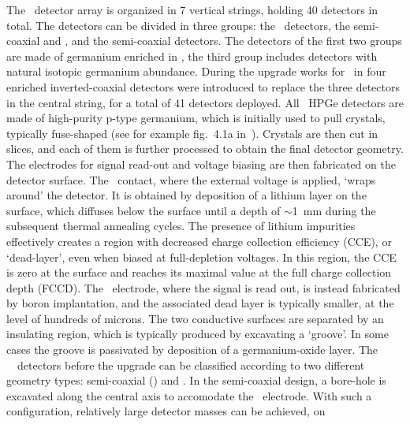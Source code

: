 The \gerdatwo\ detector array is organized in 7 vertical strings, holding 40 detectors in
total. The detectors can be divided in three groups: the \bege\ detectors, the
semi-coaxial  and , and the semi-coaxial  detectors. The detectors of
the first two groups are made of germanium enriched in \gesix, the third group includes
detectors with natural isotopic germanium abundance. During the upgrade works for
\phasetwop\ in  four enriched inverted-coaxial \IC{} detectors were introduced to
replace the three \GTF{} detectors in the central string, for a total of 41 detectors
deployed.
\newpar
All \gerda\ HPGe detectors are made of high-purity p-type germanium, which is initially
used to pull crystals, typically fuse-shaped (see for example fig.~4.1a
in~\cite{Yonenaga2019}).  Crystals are then cut in slices, and each of them is further
processed to obtain the final detector geometry. The electrodes for signal read-out and
voltage biasing are then fabricated on the detector surface. The \nplus\ contact, where the
external voltage is applied, `wraps around' the detector. It is obtained by deposition of
a lithium layer on the surface, which diffuses below the surface until a depth of
$\sim$1~mm during the subsequent thermal annealing cycles. The presence of lithium
impurities effectively creates a region with decreased charge collection efficiency (CCE),
or `dead-layer', even when biased at full-depletion voltages.  In this region, the CCE is
zero at the surface and reaches its maximal value at the full charge collection depth
(FCCD). The \pplus\ electrode, where the signal is read out, is instead fabricated by boron
implantation, and the associated dead layer is typically smaller, at the level of
hundreds of microns. The two conductive surfaces are separated by an insulating region,
which is typically produced by excavating a `groove'. In some cases the groove is
passivated by deposition of a germanium-oxide layer.
\newpar
{}
The \gerda\ \phasetwo\ detectors before the  upgrade can be classified according
to two different geometry types: semi-coaxial (\scoax) and \bege. In the semi-coaxial
design, a bore-hole is excavated along the central axis to accomodate the \pplus\
electrode. With such a configuration, relatively large detector masses can be achieved, on
